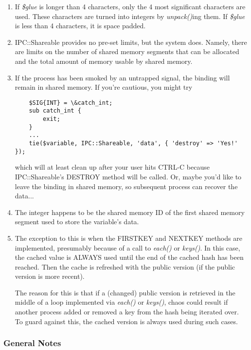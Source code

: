 \begin{enumerate}

\item
If {\em \$glue\/} is longer than 4 characters, only the 4 most significant
characters are used.  These characters are turned into integers by {\em unpack()\/}ing
them.  If {\em \$glue\/} is less than 4 characters, it is space padded.

\item
IPC::Shareable provides no pre-set limits, but the system does.
Namely, there are limits on the number of shared memory segments that
can be allocated and the total amount of memory usable by shared
memory.

\item
If the process has been smoked by an untrapped signal, the binding
will remain in shared memory.  If you're cautious, you might try
\begin{verbatim}
    $SIG{INT} = \&catch_int;
    sub catch_int {
        exit;
    }
    ...
    tie($variable, IPC::Shareable, 'data', { 'destroy' => 'Yes!' });
\end{verbatim}

which will at least clean up after your user hits CTRL-C because
IPC::Shareable's DESTROY method will be called.  Or, maybe you'd like
to leave the binding in shared memory, so subsequent process can
recover the data...

\item
The integer happens to be the shared memory ID of the first shared
memory segment used to store the variable's data.

\item
The exception to this is when the FIRSTKEY and NEXTKEY methods are
implemented, presumably because of a call to {\em each()\/} or {\em keys()\/}.  In
this case, the cached value is ALWAYS used until the end of the cached
hash has been reached.  Then the cache is refreshed with the public
version (if the public version is more recent).

The reason for this is that if a (changed) public version is retrieved
in the middle of a loop implemented via {\em each()\/} or {\em keys()\/}, chaos could
result if another process added or removed a key from the hash being
iterated over.  To guard against this, the cached version is always
used during such cases.

\end{enumerate}

\subsubsection*{General Notes}%

